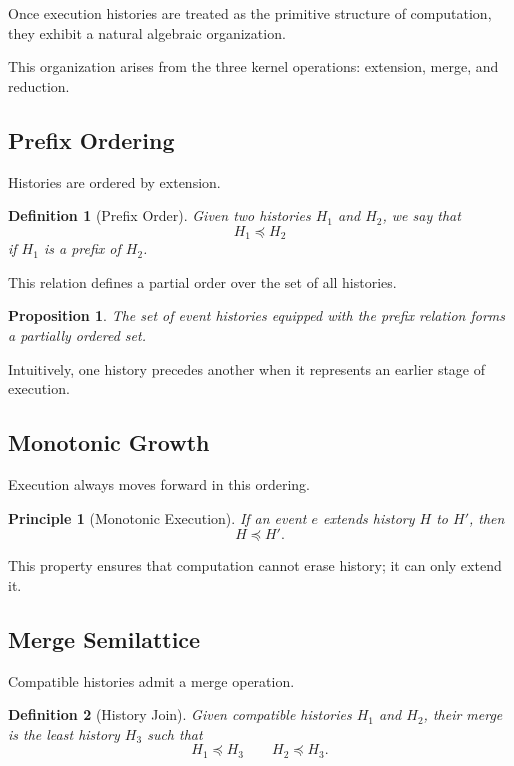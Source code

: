 \documentclass[12pt]{article}
\newtheorem{definition}{Definition}
\newtheorem{principle}{Principle}
\newtheorem{proposition}{Proposition}
\begin{document}
Once execution histories are treated as the primitive
structure of computation, they exhibit a natural algebraic
organization.

This organization arises from the three kernel operations:
extension, merge, and reduction.

\subsection{Prefix Ordering}

Histories are ordered by extension.

\begin{definition}[Prefix Order]
Given two histories $H_1$ and $H_2$, we say that
\[
H_1 \preceq H_2
\]
if $H_1$ is a prefix of $H_2$.
\end{definition}

This relation defines a partial order over the set
of all histories.

\begin{proposition}
The set of event histories equipped with the prefix
relation forms a partially ordered set.
\end{proposition}

Intuitively, one history precedes another when it
represents an earlier stage of execution.

\subsection{Monotonic Growth}

Execution always moves forward in this ordering.

\begin{principle}[Monotonic Execution]
If an event $e$ extends history $H$ to $H'$,
then
\[
H \preceq H'.
\]
\end{principle}

This property ensures that computation cannot
erase history; it can only extend it.

\subsection{Merge Semilattice}

Compatible histories admit a merge operation.

\begin{definition}[History Join]
Given compatible histories $H_1$ and $H_2$,
their merge is the least history $H_3$ such that
\[
H_1 \preceq H_3
\qquad
H_2 \preceq H_3.
\]
\end{definition}
\end{document}
